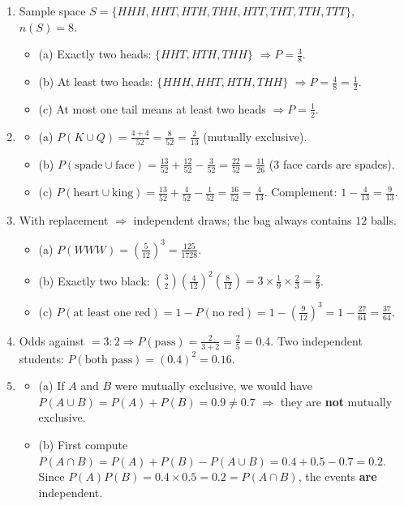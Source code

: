 \documentclass[11pt]{article}
\begin{document}
\begin{corrige}[Exercise 1]
\begin{enumerate}
\item Sample space $S=\{HHH,HHT,HTH,THH,HTT,THT,TTH,TTT\}$, $n(S)=8$.
  \begin{itemize}
  \item (a) Exactly two heads: $\{HHT,HTH,THH\}$ $\Rightarrow P=\frac{3}{8}$.
  \item (b) At least two heads: $\{HHH,HHT,HTH,THH\}$ $\Rightarrow P=\frac{4}{8}=\frac{1}{2}$.
  \item (c) At most one tail means at least two heads $\Rightarrow P=\frac{1}{2}$.
  \end{itemize}
\item \begin{itemize}
  \item (a) $P(K\cup Q)=\frac{4+4}{52}=\frac{8}{52}=\frac{2}{13}$ (mutually exclusive).
  \item (b) $P(\text{spade}\cup\text{face}) = \frac{13}{52}+\frac{12}{52}-\frac{3}{52}=\frac{22}{52}=\frac{11}{26}$ (3 face cards are spades).
  \item (c) $P(\text{heart}\cup\text{king}) = \frac{13}{52}+\frac{4}{52}-\frac{1}{52}=\frac{16}{52}=\frac{4}{13}$. Complement: $1-\frac{4}{13}=\frac{9}{13}$.
  \end{itemize}
\item With replacement $\Rightarrow$ independent draws; the bag always contains $12$ balls.
  \begin{itemize}
  \item (a) $P(WWW)=\left(\frac{5}{12}\right)^3=\frac{125}{1728}$.
  \item (b) Exactly two black: $\binom{3}{2}\left(\frac{4}{12}\right)^2\left(\frac{8}{12}\right) = 3\times\frac{1}{9}\times\frac{2}{3}=\frac{2}{9}$.
  \item (c) $P(\text{at least one red}) = 1 - P(\text{no red}) = 1 - \left(\frac{9}{12}\right)^3 = 1 - \frac{27}{64} = \frac{37}{64}$.
  \end{itemize}
\item Odds against $=3:2 \Rightarrow P(\text{pass})=\frac{2}{3+2}=\frac{2}{5}=0.4$. Two independent students: $P(\text{both pass})=(0.4)^2=0.16$.
\item \begin{itemize}
  \item (a) If $A$ and $B$ were mutually exclusive, we would have $P(A\cup B)=P(A)+P(B)=0.9 \neq 0.7$ $\Rightarrow$ they are \textbf{not} mutually exclusive.
  \item (b) First compute $P(A\cap B)=P(A)+P(B)-P(A\cup B)=0.4+0.5-0.7=0.2$. Since $P(A)P(B)=0.4\times0.5=0.2=P(A\cap B)$, the events \textbf{are} independent.
  \end{itemize}
\end{enumerate}
\end{corrige}
\end{document}
